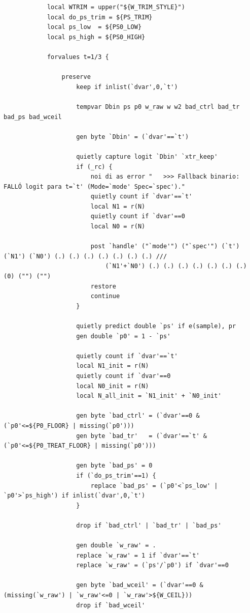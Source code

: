 \documentclass[12pt]{article}
\begin{document}
\begin{lstlisting}
            local WTRIM = upper("${W_TRIM_STYLE}")
            local do_ps_trim = ${PS_TRIM}
            local ps_low  = ${PS0_LOW}
            local ps_high = ${PS0_HIGH}

            forvalues t=1/3 {

                preserve
                    keep if inlist(`dvar',0,`t')

                    tempvar Dbin ps p0 w_raw w w2 bad_ctrl bad_tr bad_ps bad_wceil

                    gen byte `Dbin' = (`dvar'==`t')

                    quietly capture logit `Dbin' `xtr_keep'
                    if (_rc) {
                        noi di as error "   >>> Fallback binario: FALLÓ logit para t=`t' (Mode=`mode' Spec=`spec')."
                        quietly count if `dvar'==`t'
                        local N1 = r(N)
                        quietly count if `dvar'==0
                        local N0 = r(N)

                        post `handle' ("`mode'") ("`spec'") (`t') (`N1') (`N0') (.) (.) (.) (.) (.) (.) (.) ///
                            (`N1'+`N0') (.) (.) (.) (.) (.) (.) (.) (0) ("") ("")
                        restore
                        continue
                    }

                    quietly predict double `ps' if e(sample), pr
                    gen double `p0' = 1 - `ps'

                    quietly count if `dvar'==`t'
                    local N1_init = r(N)
                    quietly count if `dvar'==0
                    local N0_init = r(N)
                    local N_all_init = `N1_init' + `N0_init'

                    gen byte `bad_ctrl' = (`dvar'==0 & (`p0'<=${P0_FLOOR} | missing(`p0')))
                    gen byte `bad_tr'   = (`dvar'==`t' & (`p0'<=${P0_TREAT_FLOOR} | missing(`p0')))

                    gen byte `bad_ps' = 0
                    if (`do_ps_trim'==1) {
                        replace `bad_ps' = (`p0'<`ps_low' | `p0'>`ps_high') if inlist(`dvar',0,`t')
                    }

                    drop if `bad_ctrl' | `bad_tr' | `bad_ps'

                    gen double `w_raw' = .
                    replace `w_raw' = 1 if `dvar'==`t'
                    replace `w_raw' = (`ps'/`p0') if `dvar'==0

                    gen byte `bad_wceil' = (`dvar'==0 & (missing(`w_raw') | `w_raw'<=0 | `w_raw'>${W_CEIL}))
                    drop if `bad_wceil'


\end{lstlisting}
\end{document}
